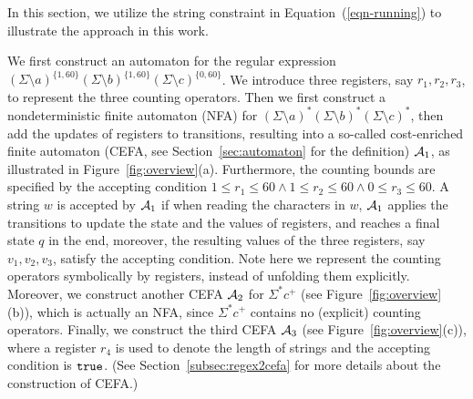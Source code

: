 

In this section, we utilize the string constraint in Equation~(\ref{eqn-running}) to illustrate the approach in this work.


We first construct an automaton for the regular expression $(\Sigma \setminus a)^{\{1, 60\}} (\Sigma \setminus b)^{\{1, 60\}} (\Sigma \setminus c)^{\{0, 60\}}$. We introduce three registers, say $r_1, r_2, r_3$, to represent the three counting operators.  
Then we first construct a nondeterministic finite automaton (NFA) for $(\Sigma \setminus a)^* (\Sigma \setminus b)^* (\Sigma \setminus c)^*$, then add the updates of registers to transitions, resulting into a so-called cost-enriched finite automaton (CEFA, see Section~\ref{sec:automaton} for the definition) $\mathcal{A}_1$,  as illustrated in Figure~\ref{fig:overview}(a). 
Furthermore, the counting bounds are specified by the accepting condition $1 \le r_1 \le 60 \wedge 1 \le r_2 \le 60 \wedge 0 \le r_3 \le 60$. 
A string $w$ is accepted by $\mathcal{A}_1$ if when reading the characters in $w$, $\mathcal{A}_1$ applies the transitions to update the state and the values of registers, and reaches a final state $q$ in the end, moreover, the resulting values of the three registers, say $v_1, v_2, v_3$, satisfy the accepting condition. 
Note here we represent the counting operators symbolically by registers, instead of unfolding them explicitly. 
Moreover, we construct another CEFA $\mathcal{A}_2$ for $\Sigma^* c^+$ (see Figure~\ref{fig:overview}(b)), which is actually an NFA, since $\Sigma^* c^+$ contains no (explicit) counting operators. Finally, we construct the third CEFA $\mathcal{A}_3$ (see Figure~\ref{fig:overview}(c)), where a register $r_4$ is used to denote the length of strings and the accepting condition is $\mathtt{true}$. (See Section~\ref{subsec:regex2cefa} for more details about the construction of CEFA.)


